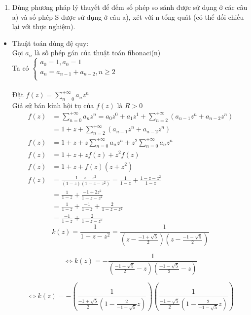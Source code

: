 \documentclass[12pt,a4paper]{article}
\begin{document}
\begin{enumerate}[label=\textbf{Câu 2:} ]
\begin{enumerate}[label=\textbf{Câu 3:} ]
\begin{enumerate}[label=\alph*)]
\item Dùng phương pháp lý thuyết để đếm số phép so sánh được sử dụng ở các câu a) và số phép
                              S được sử dụng ở câu a), xét với n tổng quát (có thể đối chiếu lại với thực nghiệm).
                    \end{enumerate}
          \end{enumerate}
\begin{itemize}
    \item Thuật toán dùng đệ quy:\\
    Gọi $a_n $ là số phép gán của thuật toán fibonaci(n)\\
    Ta có
    $\begin{cases}
        a_0=1,a_0=1 \\
        a_n=a_{n-1}+a_{n-2},n \geq 2\\
    \end{cases}$\\ \\ 
    Đặt $f(z)=\sum_{n = 0}^{+\infty}a_{n}z^n$\\
    Giả sử bán kính hội tụ của $f(z) \text{ là } R>0$\\
\begin{align*}
    f(z) &= \sum_{n=0}^{+\infty} a_n z^n = a_0 z^0 + a_1 z^1 + \sum_{n=2}^{+\infty} (a_{n-1} z^n + a_{n-2} z^n) \\
    &= 1 + z + \sum_{n=2}^{+\infty} (a_{n-1} z^n + a_{n-2} z^n) \\
    f(z) &= 1 + z + z \sum_{n=0}^{+\infty} a_n z^n + z^2 \sum_{n=0}^{+\infty} a_n z^n \\
    f(z) &= 1 + z + z f(z) + z^2 f(z) \\
    f(z) &= 1 + z + f(z)(z + z^2) \\
    f(z) &= \frac{1 - z + z^2}{(1 - z)(1 - z - z^2)} = \frac{1}{1 - z} + \frac{1 - z - z^2}{1 - z} \\
    &= \frac{1}{1 - z} + \frac{-1 + 2z^2}{1 - z - z^2} \\
    &= \frac{1}{1 - z} + \frac{-1}{1 - z} + \frac{2}{1 - z - z^2} \\
    &= \frac{-1}{1 - z} + \frac{2}{1 - z - z^2}
\end{align*}
\[
k(z) = \frac{1}{1-z-z^2} = \frac{1}{(z - \frac{-1 + \sqrt{5}}{2})(z - \frac{-1 - \sqrt{5}}{2})}
\]

\[
\Leftrightarrow k(z) = -\frac{1}{(\frac{-1 + \sqrt{5}}{2} - z)(\frac{-1 - \sqrt{5}}{2} - z)}
\]

\[
\Leftrightarrow k(z) = -\left( \frac{1}{\frac{-1 + \sqrt{5}}{2} \left( 1 - \frac{2}{-1 + \sqrt{5}}z \right)} \right) \left( \frac{1}{\frac{-1 - \sqrt{5}}{2} \left( 1 - \frac{2}{-1 - \sqrt{5}}z \right)} \right)
\]


\end{itemize}
\end{enumerate}
\end{document}
